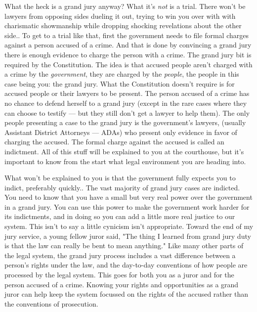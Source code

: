 \documentclass[letterpaper]{article}
\begin{document}
What the heck is a grand jury anyway? 
What it's \emph{not} is a trial.
There won't be lawyers from opposing sides dueling it out, trying to win you over with with charismatic showmanship while dropping shocking revelations about the other side.. 
To get to a trial like that, first the government needs to file formal charges against a person accused of a crime. 
And that is done by convincing a grand jury there is enough evidence to charge the person with a crime. 
The grand jury bit is required by the Constitution.
The idea is that accused people aren't charged with a crime by the \emph{government}, they are charged by the \emph{people}, the people in this case being you: the grand jury.
What the Constitution doesn't require is for accused people or their lawyers to be present.
The person accused of a crime has no chance to defend herself to a grand jury (except in the rare cases where they can choose to testify --- but they still don't get a lawyer to help them).
The only people presenting a case to the grand jury is the government's lawyers, (usually Assistant District Attorneys --- ADAs) who present only evidence in favor of charging the accused.
The formal charge against the accused is called an indictment.
All of this stuff will be explained to you at the courthouse, but it's important to know from the start what legal environment you are heading into.

What won't be explained to you is that the government fully expects you to indict, preferably quickly..
The vast majority of grand jury cases are indicted.
You need to know that you have a small but very real power over the government in a grand jury.
You can use this power to make the government work harder for its indictments, and in doing so you can add a little more real justice to our system.
This isn't to say a little cynicism isn't appropriate.
Toward the end of my jury service, a young fellow juror said, "The thing I learned from grand jury duty is that the law can really be bent to mean anything." 
Like many other parts of the legal system, the grand jury process includes a vast difference between a person's rights under the law, and the day-to-day conventions of how people are processed by the legal system.
This goes for both you as a juror and for the person accused of a crime.
Knowing your rights and opportunities as a grand juror can help keep the system focussed on the rights of the accused rather than the conventions of prosecution.
\end{document}
